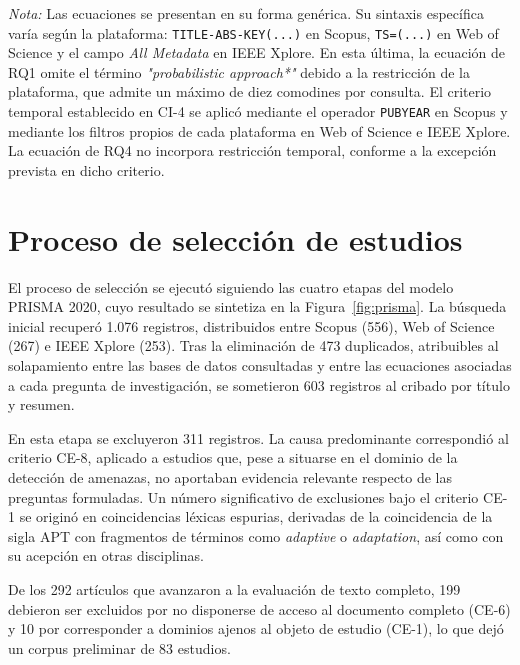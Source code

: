 \begin{table}[h!]
\vspace{2mm}
\begin{minipage}{\textwidth}
\small
\textit{Nota:} Las ecuaciones se presentan en su forma genérica. Su sintaxis específica varía según la plataforma: \texttt{TITLE-ABS-KEY(...)} en Scopus, \texttt{TS=(...)} en Web of Science y el campo \textit{All Metadata} en IEEE Xplore. En esta última, la ecuación de RQ1 omite el término \textit{"probabilistic approach*"} debido a la restricción de la plataforma, que admite un máximo de diez comodines por consulta. El criterio temporal establecido en CI-4 se aplicó mediante el operador \texttt{PUBYEAR} en Scopus y mediante los filtros propios de cada plataforma en Web of Science e IEEE Xplore. La ecuación de RQ4 no incorpora restricción temporal, conforme a la excepción prevista en dicho criterio.
\end{minipage}

\end{table}
\FloatBarrier


\section{Proceso de selección de estudios}

El proceso de selección se ejecutó siguiendo las cuatro etapas del modelo PRISMA 2020, cuyo resultado se sintetiza en la Figura~\ref{fig:prisma}. La búsqueda inicial recuperó 1.076 registros, distribuidos entre Scopus (556), Web of Science (267) e IEEE Xplore (253). Tras la eliminación de 473 duplicados, atribuibles al solapamiento entre las bases de datos consultadas y entre las ecuaciones asociadas a cada pregunta de investigación, se sometieron 603 registros al cribado por título y resumen.

En esta etapa se excluyeron 311 registros. La causa predominante correspondió al criterio CE-8, aplicado a estudios que, pese a situarse en el dominio de la detección de amenazas, no aportaban evidencia relevante respecto de las preguntas formuladas. Un número significativo de exclusiones bajo el criterio CE-1 se originó en coincidencias léxicas espurias, derivadas de la coincidencia de la sigla APT con fragmentos de términos como \textit{adaptive} o \textit{adaptation}, así como con su acepción en otras disciplinas.

De los 292 artículos que avanzaron a la evaluación de texto completo, 199 debieron ser excluidos por no disponerse de acceso al documento completo (CE-6) y 10 por corresponder a dominios ajenos al objeto de estudio (CE-1), lo que dejó un corpus preliminar de 83 estudios.

